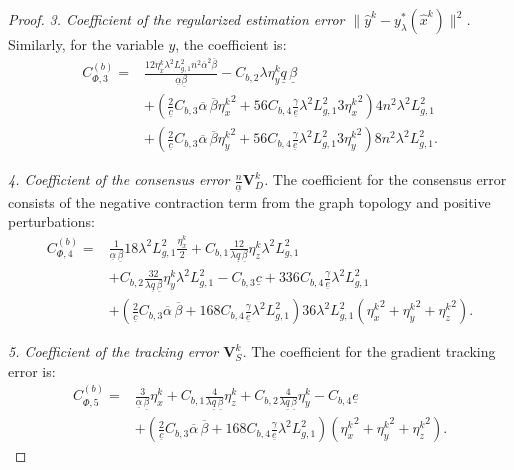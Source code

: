 \documentclass{article}
\theoremstyle{plain}
\theoremstyle{definition}
\theoremstyle{remark}
\begin{document}
\begin{proof}
    \textit{3. Coefficient of the regularized estimation error $\|\hat{y}^{k}-y_{\lambda}^*(\hat{x}^{k})\|^{2}$.}
    Similarly, for the variable $y$, the coefficient is:
    \begin{align*}
        C_{\Phi,3}^{(b)} = {}& \frac{12\eta_x^{k}\lambda^{2}L_{g,1}^{2}n^2\overline{\alpha}^{2}\overline{\beta}}{\underline{\alpha}\underline{\beta}} - C_{b,2} \lambda\eta_{y}^{k}\underline{q}\,\underline{\beta} \\
        &+ \left(\frac{2}{\underline{c}}C_{b,3}\overline{\alpha}\, \overline{\beta}{\eta_{x}^{k}}^{2} + 56C_{b,4}\frac{\gamma}{\underline{e}}\lambda^{2}L_{g,1}^{2}3{\eta_{x}^{k}}^{2}\right) 4 n^{2} \lambda^{2} L_{g,1}^{2} \\
        &+ \left(\frac{2}{\underline{c}}C_{b,3}\overline{\alpha}\, \overline{\beta} {\eta_{y}^{k}}^{2}+ 56C_{b,4}\frac{\gamma}{\underline{e}}\lambda^{2}L_{g,1}^{2}3{\eta_{y}^{k}}^{2}\right) 8 n^{2} \lambda^{2} L_{g,1}^{2}.
    \end{align*}

    \textit{4. Coefficient of the consensus error $\frac{n}{\underline{\alpha}} \mathbf{V}_{D}^{k}$.}
    The coefficient for the consensus error consists of the negative contraction term from the graph topology and positive perturbations:
    \begin{align*}
        C_{\Phi,4}^{(b)} = {}& \frac{1}{\underline{\alpha} \, \underline{\beta}} 18\lambda^{2} L_{g,1}^{2} \frac{\eta_x^{k}}{2}+ C_{b,1}\frac{12}{\lambda \underline{q}\,\underline{\beta}} \eta_{z}^{k}\lambda^{2}L_{g,1}^{2}\\
        &+ C_{b,2}\frac{32}{\lambda \underline{q}\,\underline{\beta}} \eta_{y}^{k}\lambda^{2}L_{g,1}^{2}- C_{b,3}\underline{c} + 336C_{b,4}\frac{\gamma}{\underline{e}}\lambda^{2}L_{g,1}^{2}\\
        &+ \left(\frac{2}{\underline{c}}C_{b,3}\overline{\alpha}\, \overline{\beta} + 168C_{b,4}\frac{\gamma}{\underline{e}}\lambda^{2}L_{g,1}^{2}\right) 36\lambda^{2}L_{g,1}^{2}({\eta_{x}^{k}}^{2}+{\eta_{y}^{k}}^{2}+{\eta_{z}^{k}}^{2}).
    \end{align*}

    \textit{5. Coefficient of the tracking error $\mathbf{V}_{S}^{k}$.}
    The coefficient for the gradient tracking error is:
    \begin{align*}
        C_{\Phi,5}^{(b)} = {}& \frac{3}{\underline{\alpha} \, \underline{\beta}} \eta_x^{k} + C_{b,1}\frac{4}{\lambda \underline{q}\,\underline{\beta}} \eta_{z}^{k} + C_{b,2}\frac{4}{\lambda \underline{q}\,\underline{\beta}} \eta_{y}^{k} - C_{b,4}\underline{e} \\
        &+ \left(\frac{2}{\underline{c}}C_{b,3}\overline{\alpha}\, \overline{\beta} + 168C_{b,4}\frac{\gamma}{\underline{e}}\lambda^{2}L_{g,1}^{2}\right)({\eta_{x}^{k}}^{2}+{\eta_{y}^{k}}^{2}+{\eta_{z}^{k}}^{2}).
    \end{align*}


\end{proof}
\end{document}
